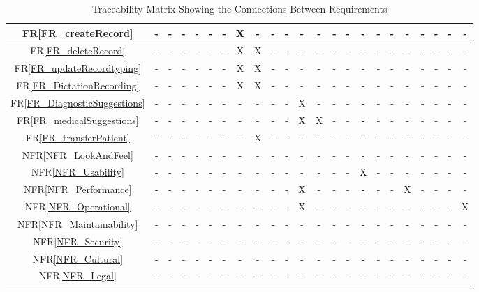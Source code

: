 \documentclass[12pt]{article}
\begin{document}
\begin{landscape}
\begin{table}[H]
\begin{tabular}{|c|c|c|c|c|c|c|c|c|c|c|c|c|c|c|c|c|c|c|c|c|c|c|}
      FR\ref{FR_createRecord} & - & - & - & - & - & - & X & - & - & - & - & - & - & - & - & - & - & - & - & - & - & - \\ \hline
      FR\ref{FR_deleteRecord} & - & - & - & - & - & - & X & X & - & - & - & - & - & - & - & - & - & - & - & - & - & - \\ \hline
      FR\ref{FR_updateRecordtyping} & - & - & - & - & - & - & X & X & - & - & - & - & - & - & - & - & - & - & - & - & - & - \\ \hline
      FR\ref{FR_DictationRecording} & - & - & - & - & - & - & X & X & - & - & - & - & - & - & - & - & - & - & - & - & - & - \\ \hline
      FR\ref{FR_DiagnosticSuggestions} & - & - & - & - & - & - & - & - & - & - & X & - & - & - & - & - & - & - & - & - & - & - \\ \hline
      FR\ref{FR_medicalSuggestions} & - & - & - & - & - & - & - & - & - & - & X & X & - & - & - & - & - & - & - & - & - & - \\ \hline
      FR\ref{FR_transferPatient} & - & - & - & - & - & - & - & X & - & - & - & - & - & - & - & - & - & - & - & - & - & - \\ \hline
      NFR\ref{NFR_LookAndFeel} & - & - & - & - & - & - & - & - & - & - & - & - & - & - & - & - & - & - & - & - & - & - \\ \hline
      NFR\ref{NFR_Usability} & - & - & - & - & - & - & - & - & - & - & - & - & - & - & X & - & - & - & - & - & - & - \\ \hline
      NFR\ref{NFR_Performance} & - & - & - & - & - & - & - & - & - & - & X & - & - & - & - & - & - & X & - & - & - & - \\ \hline
      NFR\ref{NFR_Operational} & - & - & - & - & - & - & - & - & - & - & X & - & - & - & - & - & - & - & - & - & - & X \\ \hline
      NFR\ref{NFR_Maintainability} & - & - & - & - & - & - & - & - & - & - & - & - & - & - & - & - & - & - & - & - & - & - \\ \hline
      NFR\ref{NFR_Security} & - & - & - & - & - & - & - & - & - & - & - & - & - & - & - & - & - & - & - & - & - & - \\ \hline
      NFR\ref{NFR_Cultural} & - & - & - & - & - & - & - & - & - & - & - & - & - & - & - & - & - & - & - & - & - & - \\ \hline
      NFR\ref{NFR_Legal} & - & - & - & - & - & - & - & - & - & - & - & - & - & - & - & - & - & - & - & - & - & - \\ \hline
      \end{tabular}
      \caption{Traceability Matrix Showing the Connections Between Requirements}
      \label{Table:A_trace}
      \end{table}
    \end{landscape}
  
\end{document}
